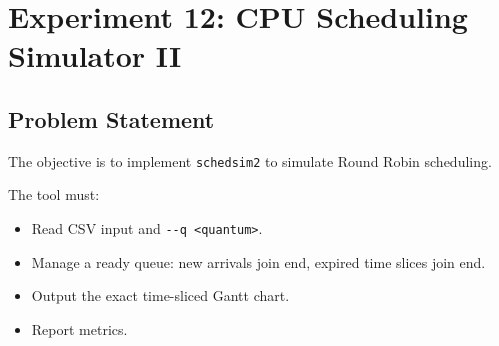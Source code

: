
\section{Experiment 12: CPU Scheduling Simulator II}

\subsection{Problem Statement}
The objective is to implement \texttt{schedsim2} to simulate Round Robin scheduling.

The tool must:
\begin{itemize}
    \item Read CSV input and \verb|--q <quantum>|.
    \item Manage a ready queue: new arrivals join end, expired time slices join end.
    \item Output the exact time-sliced Gantt chart.
    \item Report metrics.
\end{itemize}

